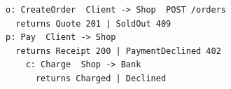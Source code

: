 \begin{lstlisting}[language={},basicstyle=\ttfamily\footnotesize,breaklines=true]
o: CreateOrder  Client -> Shop  POST /orders
  returns Quote 201 | SoldOut 409
p: Pay  Client -> Shop
  returns Receipt 200 | PaymentDeclined 402
    c: Charge  Shop -> Bank
      returns Charged | Declined
\end{lstlisting}
